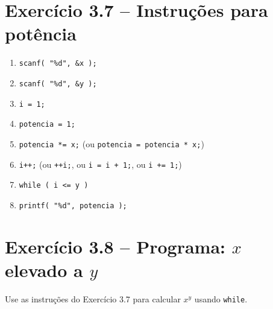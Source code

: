 \documentclass[12pt,a4paper]{article}
\begin{document}
\section{Exercício 3.7 -- Instruções para potência}

\begin{respostabox}
\begin{enumerate}[label=\textbf{\alph*)}]
\item \texttt{scanf( "\%d", \&x );}
\item \texttt{scanf( "\%d", \&y );}
\item \texttt{i = 1;}
\item \texttt{potencia = 1;}
\item \texttt{potencia *= x;} \quad (ou \texttt{potencia = potencia * x;})
\item \texttt{i++;} \quad (ou \texttt{++i;}, ou \texttt{i = i + 1;}, ou \texttt{i += 1;})
\item \texttt{while ( i <= y )}
\item \texttt{printf( "\%d", potencia );}
\end{enumerate}
\end{respostabox}

\section{Exercício 3.8 -- Programa: $x$ elevado a $y$}

\begin{enunciadoBox}[Enunciado 3.8]
Use as instruções do Exercício 3.7 para calcular $x^y$ usando \texttt{while}.
\end{enunciadoBox}
\end{document}
